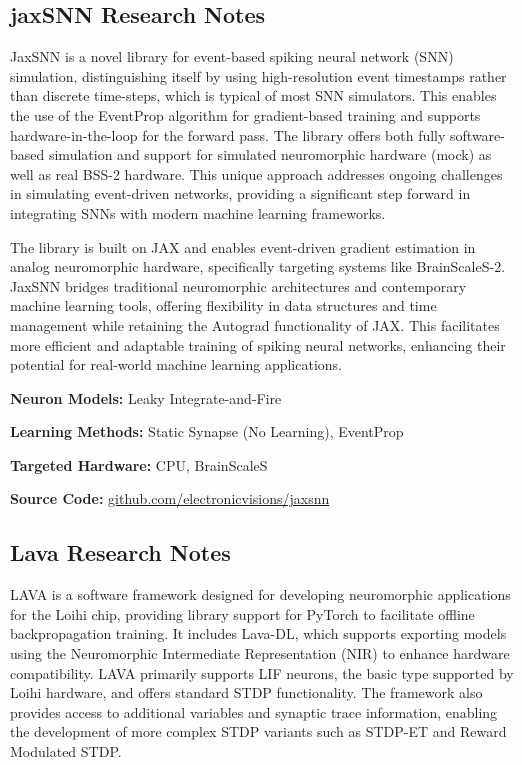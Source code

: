 \subsection*{jaxSNN Research Notes}\label{jaxSNN}

JaxSNN is a novel library for event-based spiking neural network (SNN) simulation, distinguishing itself by using high-resolution event timestamps rather than discrete time-steps, which is typical of most SNN simulators. This enables the use of the EventProp algorithm for gradient-based training and supports hardware-in-the-loop for the forward pass. The library offers both fully software-based simulation and support for simulated neuromorphic hardware (mock) as well as real BSS-2 hardware. This unique approach addresses ongoing challenges in simulating event-driven networks, providing a significant step forward in integrating SNNs with modern machine learning frameworks.

The library is built on JAX and enables event-driven gradient estimation in analog neuromorphic hardware, specifically targeting systems like BrainScaleS-2. JaxSNN bridges traditional neuromorphic architectures and contemporary machine learning tools, offering flexibility in data structures and time management while retaining the Autograd functionality of JAX. This facilitates more efficient and adaptable training of spiking neural networks, enhancing their potential for real-world machine learning applications.

\begin{tcolorbox}[enhanced,attach boxed title to top center={yshift=-3mm,yshifttext=-1mm}, colback=blue!5!white,colframe=blue!75!black,colbacktitle=red!80!black, title=jaxSNN at a Glance,fonttitle=\bfseries, boxed title style={size=small,colframe=red!50!black} ]

\textbf{Neuron Models:} Leaky Integrate-and-Fire

\textbf{Learning Methods:} Static Synapse (No Learning), EventProp  

\textbf{Targeted Hardware:} CPU, BrainScaleS 

\textbf{Source Code:} \href{https://github.com/electronicvisions/jaxsnn}{github.com/electronicvisions/jaxsnn}
\end{tcolorbox}
\subsection*{Lava Research Notes}\label{Lava}

LAVA is a software framework designed for developing neuromorphic applications for the Loihi chip, providing library support for PyTorch to facilitate offline backpropagation training. It includes Lava-DL, which supports exporting models using the Neuromorphic Intermediate Representation (NIR) to enhance hardware compatibility. LAVA primarily supports LIF neurons, the basic type supported by Loihi hardware, and offers standard STDP functionality. The framework also provides access to additional variables and synaptic trace information, enabling the development of more complex STDP variants such as STDP-ET and Reward Modulated STDP.

